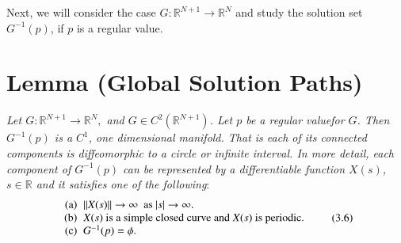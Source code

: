 Next, we will consider the case $G : \mathbb{R}^{N+1} \rightarrow
\mathbb{R}^N$ and study the solution set $G^{-1}(p)$, if $p$ is a
regular value. 

\section{Lemma (Global Solution Paths)}\label{chap3-sec3.6}%

\textit{Let $G : \mathbb{R}^{N+1} \rightarrow \mathbb{R}^N, $
and $G \in C^2 (\mathbb{R}^{N+1})$. Let $p$ be a
  regular value\pageoriginale for $G$. Then $G^{-1} (p)$ is a $C^1$,
one dimensional manifold. That is each of its connected
components is diffeomorphic to a circle or infinite interval. In more
  detail, each component of $G^{-1}(p)$ can be represented by
  a differentiable function $X(s)$, $s \in \mathbb{R}$ and it
  satisfies one of the following}: 
\begin{equation*}
\begin{array}{r@{\;\;}l}
\text{(a)} & ||X(s)||\rightarrow \infty \text{ \ as\ } |s|
\rightarrow \infty.\\  
\text{(b)} & {X(s)} \text{ is a simple closed curve and $X(s)$
is periodic.}\\ 
\text{(c)} & G^{-1} (p) = \phi.
\end{array}\tag{3.6}\label{chap3-sec3.6-eq3.6}
\end{equation*}

